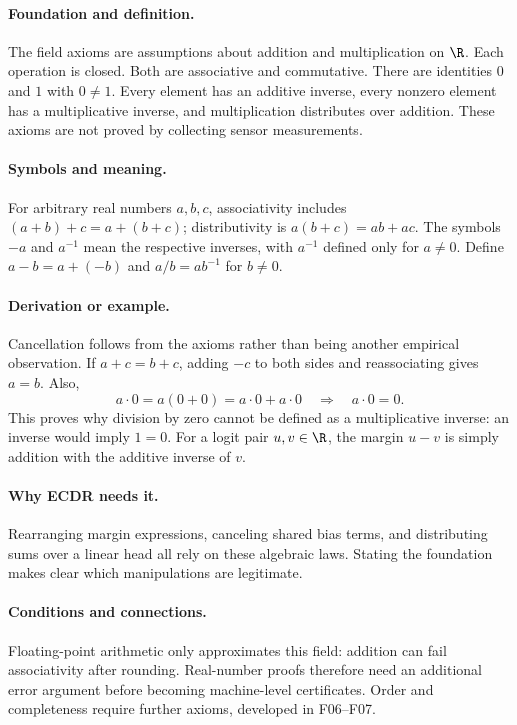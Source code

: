 \paragraph{Foundation and definition.}
The field axioms are assumptions about addition and multiplication on
$\R$. Each operation is closed. Both are associative and commutative.
There are identities $0$ and $1$ with $0\ne1$. Every element has an
additive inverse, every nonzero element has a multiplicative inverse, and
multiplication distributes over addition. These axioms are not proved
by collecting sensor measurements.
\paragraph{Symbols and meaning.}
For arbitrary real numbers $a,b,c$, associativity includes
$(a+b)+c=a+(b+c)$; distributivity is $a(b+c)=ab+ac$. The symbols
$-a$ and $a^{-1}$ mean the respective inverses, with $a^{-1}$ defined
only for $a\ne0$. Define $a-b=a+(-b)$ and $a/b=a b^{-1}$ for $b\ne0$.
\paragraph{Derivation or example.}
Cancellation follows from the axioms rather than being another empirical
observation. If $a+c=b+c$, adding $-c$ to both sides and reassociating
gives $a=b$. Also,
\[
 a\cdot0=a(0+0)=a\cdot0+a\cdot0
 \quad\Rightarrow\quad a\cdot0=0.
\]
This proves why division by zero cannot be defined as a multiplicative
inverse: an inverse would imply $1=0$. For a logit pair $u,v\in\R$,
the margin $u-v$ is simply addition with the additive inverse of $v$.
\paragraph{Why ECDR needs it.}
Rearranging margin expressions, canceling shared bias terms, and
distributing sums over a linear head all rely on these algebraic laws.
Stating the foundation makes clear which manipulations are legitimate.
\paragraph{Conditions and connections.}
Floating-point arithmetic only approximates this field: addition can
fail associativity after rounding. Real-number proofs therefore need an
additional error argument before becoming machine-level certificates.
Order and completeness require further axioms, developed in F06--F07.

